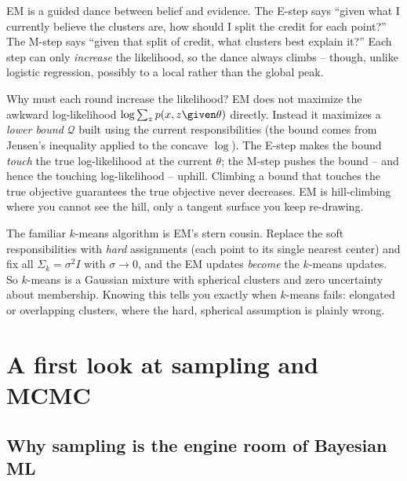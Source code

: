 \begin{intuitionbox}
EM is a guided dance between belief and evidence. The E-step says ``given what I
currently believe the clusters are, how should I split the credit for each
point?'' The M-step says ``given that split of credit, what clusters best explain
it?'' Each step can only \emph{increase} the likelihood, so the dance always
climbs -- though, unlike logistic regression, possibly to a local rather than the
global peak.
\end{intuitionbox}

\begin{whybox}
Why must each round increase the likelihood? EM does not maximize the awkward
log-likelihood $\log\sum_z p(x,z\given\theta)$ directly. Instead it maximizes a
\emph{lower bound} $\mathcal{Q}$ built using the current responsibilities (the
bound comes from Jensen's inequality applied to the concave $\log$). The E-step
makes the bound \emph{touch} the true log-likelihood at the current $\theta$; the
M-step pushes the bound -- and hence the touching log-likelihood -- uphill. Climbing
a bound that touches the true objective guarantees the true objective never
decreases. EM is hill-climbing where you cannot see the hill, only a tangent
surface you keep re-drawing.
\end{whybox}

\begin{connectionbox}
The familiar $k$-means algorithm is EM's stern cousin. Replace the soft
responsibilities with \emph{hard} assignments (each point to its single nearest
center) and fix all $\Sigma_k = \sigma^2 I$ with $\sigma\to 0$, and the EM updates
\emph{become} the $k$-means updates. So $k$-means is a Gaussian mixture with
spherical clusters and zero uncertainty about membership. Knowing this tells you
exactly when $k$-means fails: elongated or overlapping clusters, where the hard,
spherical assumption is plainly wrong.
\end{connectionbox}

\section{A first look at sampling and MCMC}
\label{ch34:mcmc}

\subsection{Why sampling is the engine room of Bayesian ML}

